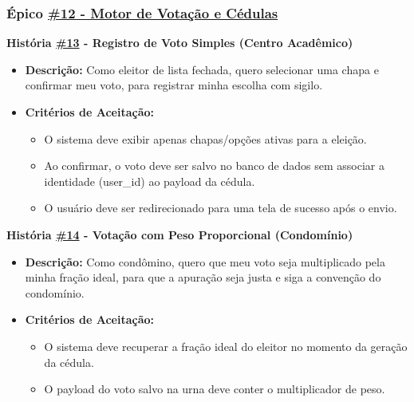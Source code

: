 \documentclass[12pt,a4paper]{article}
\begin{document}
\subsubsection*{Épico \href{https://github.com/gsscala/MC656/issues/12}{\#12 - Motor de Votação e Cédulas}}
\textbf{História \href{https://github.com/gsscala/MC656/issues/13}{\#13} - Registro de Voto Simples (Centro Acadêmico)}
\begin{itemize}
    \item \textbf{Descrição:} Como eleitor de lista fechada, quero selecionar uma chapa e confirmar meu voto, para registrar minha escolha com sigilo.
    \item \textbf{Critérios de Aceitação:}
    \begin{itemize}
        \item O sistema deve exibir apenas chapas/opções ativas para a eleição.
        \item Ao confirmar, o voto deve ser salvo no banco de dados sem associar a identidade (user\_id) ao payload da cédula.
        \item O usuário deve ser redirecionado para uma tela de sucesso após o envio.
    \end{itemize}
\end{itemize}

\textbf{História \href{https://github.com/gsscala/MC656/issues/14}{\#14} - Votação com Peso Proporcional (Condomínio)}
\begin{itemize}
    \item \textbf{Descrição:} Como condômino, quero que meu voto seja multiplicado pela minha fração ideal, para que a apuração seja justa e siga a convenção do condomínio.
    \item \textbf{Critérios de Aceitação:}
    \begin{itemize}
        \item O sistema deve recuperar a fração ideal do eleitor no momento da geração da cédula.
        \item O payload do voto salvo na urna deve conter o multiplicador de peso.
    \end{itemize}
\end{itemize}
\end{document}

